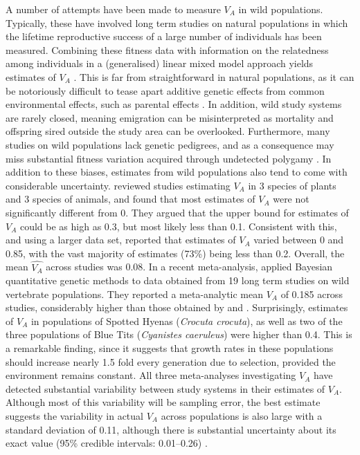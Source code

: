 \documentclass[12pt]{article}
\begin{document}
\begin{bibunit}
A number of attempts have been made to measure $V_A$ in wild populations. Typically, these have involved long term studies on natural populations in which the lifetime reproductive success of a large number of individuals has been measured. Combining these fitness data with information on the relatedness among individuals in a (generalised) linear mixed model approach yields estimates of $V_A$ \citep{kruuk2004estimating}. This is far from straightforward in natural populations, as it can be notoriously difficult to tease apart additive genetic effects from common environmental effects, such as parental effects \citep{kruuk2007separate, shaw2014quantitative}. In addition, wild study systems are rarely closed, meaning emigration can be misinterpreted as mortality and offspring sired outside the study area can be overlooked. Furthermore, many studies on wild populations lack genetic pedigrees, and as a consequence may miss substantial fitness variation acquired through undetected polygamy \citep{vedder2011polygyny, charmantier2006testing}. In addition to these biases, estimates from wild populations also tend to come with considerable uncertainty. \citet{burt1995evolution} reviewed studies estimating $V_A$ in 3 species of plants and 3 species of animals, and found that most estimates of $V_A$ were not significantly different from 0. They argued that the upper bound for estimates of $V_A$ could be as high as 0.3, but most likely less than 0.1. Consistent with this, and using a larger data set, \citet{hendry2018contemporary} reported that estimates of $V_A$ varied between 0 and 0.85, with the vast majority of estimates (73\%) being less than 0.2. Overall, the mean $\widehat{V_A}$ across studies was 0.08. In a recent meta-analysis, \citet{bonnet2022genetic} applied Bayesian quantitative genetic methods to data obtained from 19 long term studies on wild vertebrate populations. They reported a meta-analytic mean $V_A$ of 0.185 across studies, considerably higher than those obtained by \citet{burt1995evolution} and \citet{hendry2018contemporary}. Surprisingly, estimates of $V_A$ in populations of Spotted Hyenas (\emph{Crocuta crocuta}), as well as two of the three populations of Blue Tits (\emph{Cyanistes caeruleus}) were higher than 0.4. This is a remarkable finding, since it suggests that growth rates in these populations should increase nearly 1.5 fold every generation due to selection, provided the environment remains constant. All three meta-analyses investigating $V_A$ \citep{burt1995evolution,hendry2018contemporary,bonnet2022genetic} have detected substantial variability between study systems in their estimates of $V_A$. Although most of this variability will be sampling error, the best estimate suggests the variability in actual $V_A$ across populations is also large with a standard deviation of 0.11, although there is substantial uncertainty about its exact value (95\% credible intervals: 0.01--0.26) \citep{bonnet2022genetic}.  


\end{bibunit}
\end{document}
